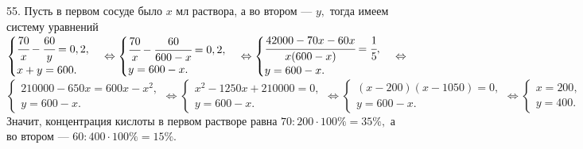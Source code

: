 55. Пусть в первом сосуде было $x$ мл раствора, а во втором --- $y,$ тогда имеем систему уравнений $\begin{cases}\cfrac{70}{x}-\cfrac{60}{y}=0,2,\\
x+y=600.\end{cases}\Leftrightarrow\begin{cases}\cfrac{70}{x}-\cfrac{60}{600-x}=0,2,\\
y=600-x.\end{cases}\Leftrightarrow\begin{cases}\cfrac{42000-70x-60x}{x(600-x)}=\cfrac{1}{5},\\
y=600-x.\end{cases}\Leftrightarrow$\\$\begin{cases}210000-650x=600x-x^2,\\
y=600-x.\end{cases}\Leftrightarrow\begin{cases}x^2-1250x+210000=0,\\
y=600-x.\end{cases}\Leftrightarrow\begin{cases}(x-200)(x-1050)=0,\\
y=600-x.\end{cases}\Leftrightarrow\begin{cases}x=200,\\
y=400.\end{cases}$ Значит, концентрация кислоты в первом растворе равна $70:200\cdot100\%=35\%,$ а во втором --- $60:400\cdot100\%=15\%.$\\
